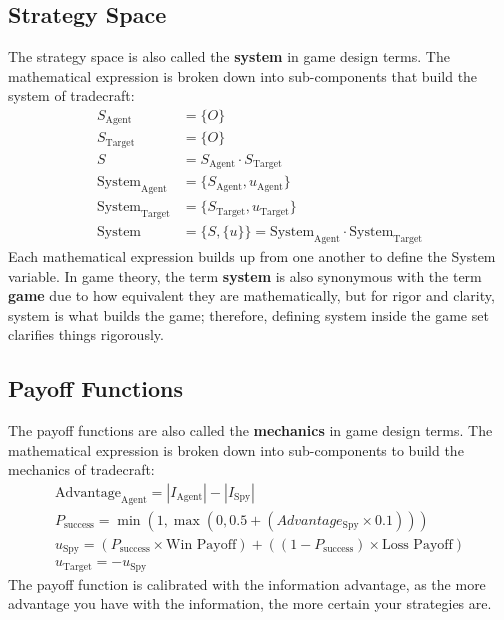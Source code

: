 \documentclass{article}
\begin{document}
\subsection{Strategy Space}
The strategy space is also called the \textbf{system} in game design terms. The mathematical expression is broken down into sub-components that build the system of tradecraft:
\begin{align*}
S_{\text{Agent}} &= \{O\} \\
S_{\text{Target}} &= \{O\} \\
S &= S_{\text{Agent}} \cdot S_{\text{Target}} \\
\text{System}_{\text{Agent}} &= \{S_{\text{Agent}}, u_{\text{Agent}}\} \\
\text{System}_{\text{Target}} &= \{S_{\text{Target}}, u_{\text{Target}}\} \\
\text{System} &= \{S, \{u\}\} = \text{System}_{\text{Agent}} \cdot \text{System}_{\text{Target}}
\end{align*}
Each mathematical expression builds up from one another to define the System variable. In game theory, the term \textbf{system} is also synonymous with the term \textbf{game} due to how equivalent they are mathematically, but for rigor and clarity, system is what builds the game; therefore, defining system inside the game set clarifies things rigorously.

\subsection{Payoff Functions}
The payoff functions are also called the \textbf{mechanics} in game design terms. The mathematical expression is broken down into sub-components to build the mechanics of tradecraft:
\begin{align*}
\text{Advantage}_{\text{Agent}} = |I_{\text{Agent}}| - |I_{\text{Spy}}| \\
P_{\text{success}} = \min(1, \max(0, 0.5 + (Advantage_{\text{Spy}} \times 0.1))) \\
u_{\text{Spy}} = (P_{\text{success}} \times \text{Win Payoff}) + ((1 - P_{\text{success}}) \times \text{Loss Payoff}) \\
u_{\text{Target}} = -u_{\text{Spy}}
\end{align*}
The payoff function is calibrated with the information advantage, as the more advantage you have with the information, the more certain your strategies are.
\end{document}
